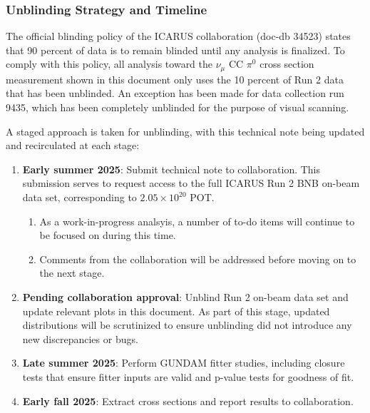 \documentclass[../main.tex]{subfiles}
\begin{document}
\subsubsection{Unblinding Strategy and Timeline}
The official blinding policy of the ICARUS collaboration (doc-db 34523) states that 90 percent of data is to remain blinded until any analysis is finalized.  To comply with this policy, all analysis toward the $\nu_{\mu}$ CC $\pi^{0}$ cross section measurement shown in this document only uses the 10 percent of Run 2 data that has been unblinded.  An exception has been made for data collection run 9435, which has been completely unblinded for the purpose of visual scanning.

A staged approach is taken for unblinding, with this technical note being updated and recirculated at each stage:
\begin{enumerate}
    \item \textbf{Early summer 2025}: Submit technical note to collaboration.  This submission serves to request access to the full ICARUS Run 2 BNB on-beam data set, corresponding to $2.05 \times 10^{20}$ POT.
    \begin{enumerate}
        \item As a work-in-progress analsyis, a number of to-do items will continue to be focused on during this time.
        \item Comments from the collaboration will be addressed before moving on to the next stage.
    \end{enumerate}
    \item \textbf{Pending collaboration approval}: Unblind Run 2 on-beam data set and update relevant plots in this document.  As part of this stage, updated distributions will be scrutinized to ensure unblinding did not introduce any new discrepancies or bugs. 
    \item \textbf{Late summer 2025}: Perform GUNDAM fitter studies, including closure tests that ensure fitter inputs are valid and p-value tests for goodness of fit.
    \item \textbf{Early fall 2025}: Extract cross sections and report results to collaboration.
\end{enumerate}
\end{document}

